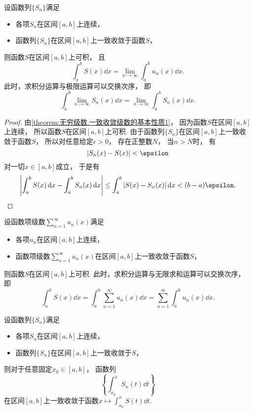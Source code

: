 \begin{theorem}\label{theorem:无穷级数.一致收敛级数的基本性质3}
设函数列\(\{S_n\}\)满足\begin{itemize}
	\item 各项\(S_n\)在区间\([a,b]\)上连续，
	\item 函数列\(\{S_n\}\)在区间\([a,b]\)上一致收敛于函数\(S\)，
\end{itemize}
则函数\(S\)在区间\([a,b]\)上可积，
且\[
	\int_a^b S(x) \dd{x}
	= \lim_{n\to\infty} \int_a^b u_n(x) \dd{x}.
\]
此时，求积分运算与极限运算可以交换次序，
即\[
	\int_a^b \lim_{n\to\infty} S_n(x) \dd{x}
	= \lim_{n\to\infty} \int_a^b S_n(x) \dd{x}.
\]
\begin{proof}
由\cref{theorem:无穷级数.一致收敛级数的基本性质1}，
因为函数\(S\)在区间\([a,b]\)上连续，
所以函数\(S\)在区间\([a,b]\)上可积.
由于函数列\(\{S_n\}\)在区间\([a,b]\)上一致收敛于函数\(S\)，
所以对任意给定\(\epsilon>0\)，
存在正整数\(N\)，
当\(n>N\)时，
有\[
	\abs{S_n(x) - S(x)} < \epsilon
\]对一切\(x\in[a,b]\)成立，
于是有\[
	\abs{\int_a^b S(x) \dd{x} - \int_a^b S_n(x) \dd{x}}
	\leq \int_a^b \abs{S(x) - S_n(x)} \dd{x}
	< (b-a) \epsilon.
	\qedhere
\]
\end{proof}
\end{theorem}
\begin{theorem}
设函数项级数\(\sum_{n=1}^\infty u_n(x)\)满足\begin{itemize}
	\item 各项\(u_n\)在区间\([a,b]\)上连续，
	\item 函数项级数\(\sum_{n=1}^\infty u_n(x)\)在区间\([a,b]\)上一致收敛于函数\(S\)，
\end{itemize}
则函数\(S\)在区间\([a,b]\)上可积.
此时，求积分运算与无限求和运算可以交换次序，
即\[
	\int_a^b S(x) \dd{x}
	= \int_a^b \sum_{n=1}^\infty u_n(x) \dd{x}
	= \sum_{n=1}^\infty \int_a^b u_n(x) \dd{x}.
\]
\end{theorem}
\begin{proposition}
设函数列\(\{S_n\}\)满足\begin{itemize}
	\item 各项\(S_n\)在区间\([a,b]\)上连续，
	\item 函数列\(\{S_n\}\)在区间\([a,b]\)上一致收敛于\(S\)，
\end{itemize}
则对于任意固定\(x_0\in[a,b]\)，
函数列\[
	\left\{\int_{x_0}^x S_n(t) \dd{t}\right\}
\]在区间\([a,b]\)上一致收敛于函数\(x \mapsto \int_{x_0}^x S(t) \dd{t}\).
\end{proposition}
